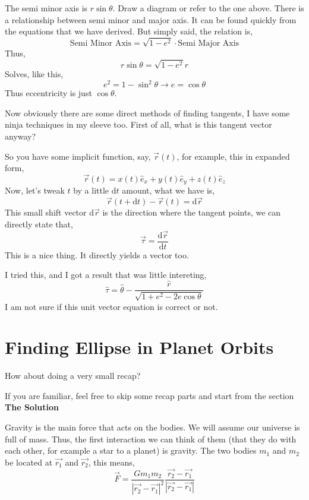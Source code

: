 \documentclass[12pt,a4paper]{article}
\begin{document}
The semi minor axis is $r \sin \theta$. Draw a diagram or refer to the one above. There is a relationship between semi minor and major axis. It can be found quickly from the equations that we have derived. But simply said, the relation is,
\[ 
\text{Semi Minor Axis} = \sqrt{1 - e^2}  \cdot \text{Semi Major Axis}
\]
Thus,
\[ 
r \sin \theta = \sqrt{1 - e^2}  r
\]
Solves, like this,
\[ 
e^2 = 1 - \sin ^2 \theta \to \boxed{  e = \cos \theta}
\]
Thus eccentricity is just $\cos \theta$. 

Now obviously there are some direct methods of finding tangents, I have some ninja techniques in my sleeve too. First of all, what is this tangent vector anyway?

So you have some implicit function, say, $\vec{r}\left( t \right) $, for example, this in expanded form,
\[ 
    \vec{r} \left( t \right)  = x\left( t \right)  \hat{e}_x +
    y\left( t \right) \hat{e}_y +
    z\left( t \right) \hat{e}_z
\]
Now, let's tweak $t$ by a little $\mathrm{d} t$ amount, what we have is,
\[ 
    \vec{r}\left( t + \mathrm{d} t \right)  - \vec{r}\left( t  \right) = \mathrm{d} \vec{r}
\] 
This small shift vector $\mathrm{d} \vec{r}$ is the direction where the tangent points, we can directly state that,
\[ 
\vec{\tau} = \frac{\mathrm{d} \vec{r}}{\mathrm{d} t}
\]
This is a nice thing. It directly yields a vector too. 

I tried this, and I got a result that was little intereting,
\[ 
    \hat{\tau} = \hat{\theta} - \frac{\hat{r}}{\sqrt{1 + e^2 - 2 e \cos \theta} }
\] I am not sure if this unit vector equation is correct or not.

















\section{ Finding Ellipse in Planet Orbits }
How about doing a very small recap? 

If you are familiar, feel free to skip some recap parts and start from the section \textbf{The Solution}


Gravity is the main force that acts on the bodies. We will assume our universe is full of mass. Thus, the first interaction we can think of them (that they do with each other, for example a star to a planet) is gravity. The two bodies $m_1$ and $m_2$ be located at $\vec{r_1}$ and $\vec{r_2}$, this means, 
\[ 
    \vec{F} = \frac{Gm_1m_2}{|\vec{r_2} - \vec{r_1}|^2} \frac{\vec{r_2} - \vec{r_1}}{| \vec{r_2} - \vec{r_1}|}
\]
\end{document}
